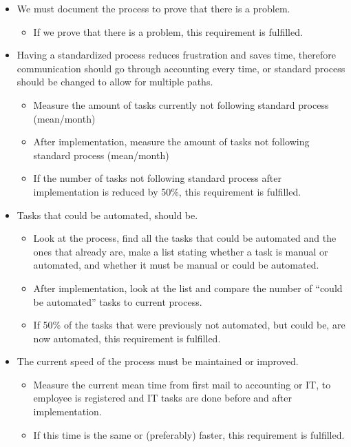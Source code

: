 \begin{itemize}
\item
We must document the process to prove that there is a problem.
\begin{itemize}
\item If we prove that there is a problem, this requirement is fulfilled.
\end{itemize} 
\item
Having a standardized process reduces frustration and saves time, therefore communication should go through accounting every time, or standard process should be changed to allow for multiple paths.
\begin{itemize}
\item
Measure the amount of tasks currently not following standard process (mean/month)
\item
After implementation, measure the amount of tasks not following standard process (mean/month)
\item
If the number of tasks not following standard process after implementation is reduced by 50\%, this requirement is fulfilled.
\end{itemize}
\item
Tasks that could be automated, should be.
\begin{itemize}
\item
Look at the process, find all the tasks that could be automated and the ones that already are, make a list stating whether a task is manual or automated, and whether it must be manual or could be automated.
\item
After implementation, look at the list and compare the number of “could be automated” tasks to current process.
\item
If 50\% of the tasks that were previously not automated, but could be, are now automated, this requirement is fulfilled.
\end{itemize}
\item
The current speed of the process must be maintained or improved.
\begin{itemize}
\item
Measure the current mean time from first mail to accounting or IT, to employee is registered and IT tasks are done before and after implementation.
\item
If this time is the same or (preferably) faster, this requirement is fulfilled.
\end{itemize}
\end{itemize}